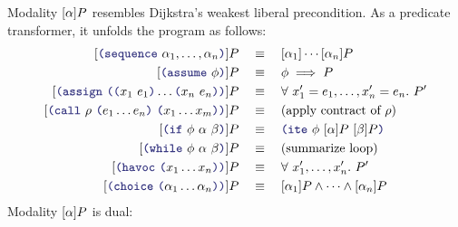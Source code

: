 \documentclass[runningheads]{llncs}
\begin{document}
Modality $[\alpha]P$ resembles Dijkstra's weakest liberal precondition.
As a predicate transformer, it unfolds the program as follows:
\begin{align*}
\BOX{\LP \terminal{sequence}~ \alpha_1, \dots, \alpha_n \RP}{P}
    &\quad \equiv \quad
         \BOX{\alpha_1}{} \cdots {\BOX{\alpha_n}{P}}
    \\
\BOX{\LP \terminal{assume}~\phi \RP}{P}
    &\quad \equiv \quad
         \phi \implies P
    \\
\BOX{\LP \terminal{assign}~\LP \LP x_1~e_1 \RP \dots \LP x_n~e_n \RP \RP}{P}
    &\quad \equiv \quad
         \forall\ x'_1 = e_1, \dots, x'_n = e_n.\ P'
    \\
\BOX{\LP \terminal{call}~ \rho~ \LP e_1 \dots e_n \RP~
                               \LP x_1 \dots x_m \RP \RP}{P}
    &\quad \equiv \quad
        \text{(apply contract of $\rho$)}
    \\
\BOX{\LP \terminal{if}~\phi~\alpha~\beta \RP}{P}
    &\quad \equiv \quad
        \LP \terminal{ite}~\phi~
                \BOX{\alpha}{P}~
                \BOX{\beta}{P} \RP
    \\
\BOX{\LP \terminal{while}~\phi~\alpha~\beta \RP}{P}
    &\quad \equiv \quad
        \text{(summarize loop)}
    \\
\BOX{\LP \terminal{havoc}~\LP x_1 \dots x_n \RP \RP}{P}
    &\quad \equiv \quad
         \forall\ x'_1, \dots, x'_n.\ P'
    \\
\BOX{\LP \terminal{choice}~\LP \alpha_1 \dots \alpha_n \RP \RP}{P}
    &\quad \equiv \quad
         \BOX{\alpha_1}{P} \land \dots \land \BOX{\alpha_n}{P}
\end{align*}
Modality $[\alpha]P$ is dual:
\end{document}
